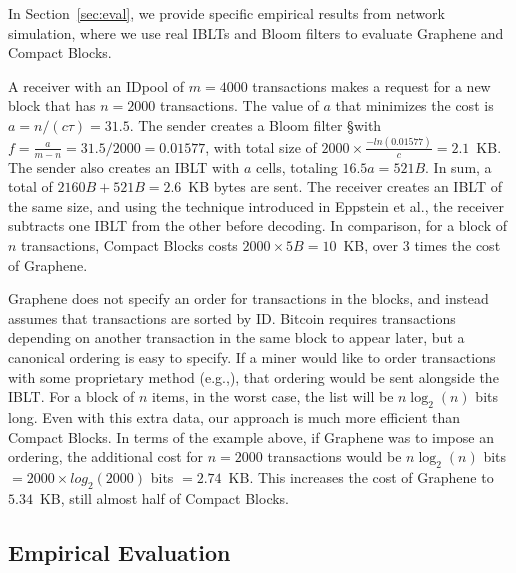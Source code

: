 In Section~\ref{sec:eval}, we provide specific empirical results from network simulation, where we use real IBLTs and Bloom filters to evaluate Graphene and Compact Blocks.

 A receiver with an IDpool of $m=4000$ transactions
makes a request for a new block that has $n=2000$ transactions. The
value of $a$ that minimizes the cost is $a=n/(c\tau)=31.5$. The sender
creates a Bloom filter \S with $f=\frac{a}{m-n}=31.5/2000= 0.01577$,
with total size of $2000\times \frac{-ln( 0.01577)}{c}=2.1$~KB.  The
sender also creates an IBLT with $a$ cells, totaling $16.5a=521B$. In
sum, a total of $2160B+521B=2.6$~KB bytes are sent.  The receiver
creates an IBLT of the same size, and using the technique introduced
in Eppstein et al.\cite{eppstein:2011}, the receiver subtracts one
IBLT from the other before decoding. In comparison, for a block of $n$ transactions, Compact Blocks costs $2000\times5B = 10$~KB, over 3 times the cost of Graphene. 

 Graphene does not specify an order for transactions
in the blocks, and instead assumes that transactions are sorted by
ID. Bitcoin requires transactions depending on another transaction in
the same block to appear later, but a canonical ordering is easy to
specify. If a miner would like to order transactions with some
proprietary method (e.g.,\cite{Hanke:2016}), that ordering would be
sent alongside the IBLT. For a block of $n$ items, in the worst case,
the list will be $n\log_2(n)$ bits long.  Even with this extra data, our approach is much more efficient than Compact Blocks.   In terms of the example above, if Graphene was to impose an ordering, the additional cost for $n=2000$ transactions would be $n \log_2(n)$ bits $= 2000\times log_2(2000)$ bits $= 2.74$~KB. This increases the cost of Graphene to $5.34$~KB, still almost half of Compact Blocks.


\subsection{Empirical Evaluation}


